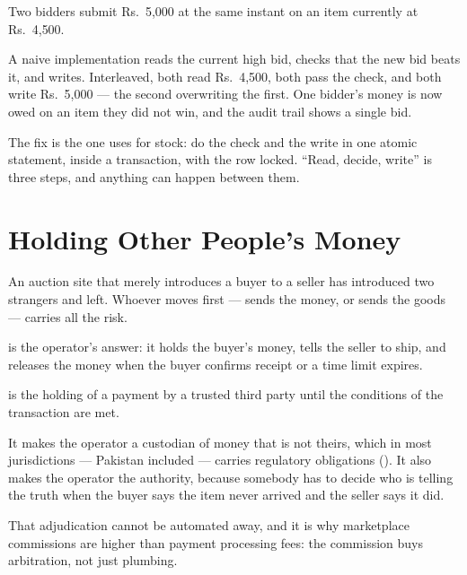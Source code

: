 \begin{alertbox}
Two bidders submit Rs.~5{,}000 at the same instant on an item currently at
Rs.~4{,}500.

\smallskip
A naive implementation reads the current high bid, checks that the new bid
beats it, and writes. Interleaved, both read Rs.~4{,}500, both pass the check,
and both write Rs.~5{,}000 --- the second overwriting the first. One bidder's
money is now owed on an item they did not win, and the audit trail shows a
single bid.

\smallskip
The fix is the one  uses for stock: do the check and the write
in one atomic statement, inside a transaction, with the row locked. ``Read,
decide, write'' is three steps, and anything can happen between them.
\end{alertbox}

\section{Holding Other People's Money}

An auction site that merely introduces a buyer to a seller has introduced two
strangers and left. Whoever moves first --- sends the money, or sends the goods
--- carries all the risk.

 is the operator's answer: it holds the buyer's money, tells the
seller to ship, and releases the money when the buyer confirms receipt or a
time limit expires.

\begin{definitionbox}
 is the holding of a payment by a trusted third party until the
conditions of the transaction are met.

\smallskip
It makes the operator a custodian of money that is not theirs, which in most
jurisdictions --- Pakistan included --- carries regulatory obligations
(). It also makes the operator the 
authority, because somebody has to decide who is telling the truth when the
buyer says the item never arrived and the seller says it did.

\smallskip
That adjudication cannot be automated away, and it is why marketplace
commissions are higher than payment processing fees: the commission buys
arbitration, not just plumbing.
\end{definitionbox}

